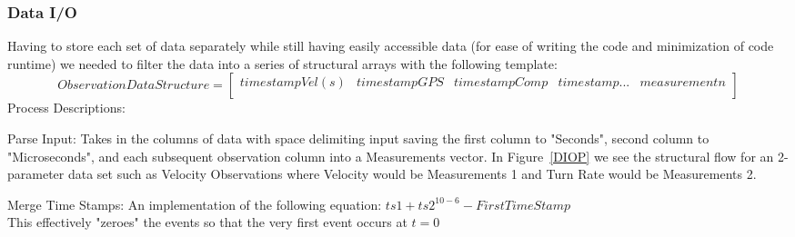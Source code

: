 		
		
		
		\pagebreak
		\subsubsection{Data I/O}
			Having to store each set of data separately while still having easily accessible data (for ease of writing the code and minimization of code runtime) we needed to filter the data into a series of structural arrays with the following template:
			$$Observation Data Structure =
			\begin{bmatrix}
			timestampVel (s) & timestampGPS & timestampComp & timestamp... & measurement n\\
			\end{bmatrix}
			$$
			Process Descriptions:
			\begin{list}{)~}{}
				\item Parse Input: Takes in the columns of data with space delimiting input saving the first column to "Seconds", second column to "Microseconds", and each subsequent observation column into a Measurements vector. In Figure~\ref{DIOP} we see the structural flow for an 2-parameter data set such as Velocity Observations where Velocity would be Measurements 1 and Turn Rate would be Measurements 2.
				\item Merge Time Stamps: An implementation of the following equation: $ts1+ts2^{10-6} - First Time Stamp$\\
				This effectively "zeroes" the events so that the very first event occurs at $t = 0$		
			\end{list}
			
